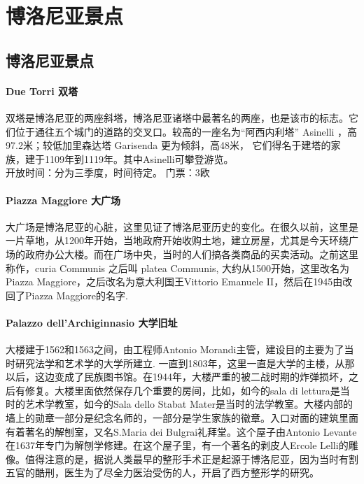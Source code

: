 \chapter{博洛尼亚景点}              


\section{博洛尼亚景点}

\subsubsection{Due Torri 双塔}
双塔是博洛尼亚的两座斜塔，博洛尼亚诸塔中最著名的两座，也是该市的标志。它们位于通往五个城门的道路的交叉口。较高的一座名为“阿西内利塔” Asinelli  ，高97.2米；较低加里森达塔 Garisenda 更为倾斜，高48米， 它们得名于建塔的家族，建于1109年到1119年。其中Asinelli可攀登游览。\\
开放时间：分为三季度，时间待定。 门票：3欧


\subsubsection{Piazza Maggiore 大广场}
大广场是博洛尼亚的心脏，这里见证了博洛尼亚历史的变化。在很久以前，这里是一片草地，从1200年开始，当地政府开始收购土地，建立房屋，尤其是今天环绕广场的政府办公大楼。而在广场中央，当时的人们搞各类商品的买卖活动。之前这里称作，curia Communis 之后叫 platea Communis, 大约从1500开始，这里改名为Piazza Maggiore，之后改名为意大利国王Vittorio Emanuele II，然后在1945由改回了Piazza Maggiore的名字.
 
\subsubsection{Palazzo dell'Archiginnasio 大学旧址}
大楼建于1562和1563之间，由工程师Antonio Morandi主管，建设目的主要为了当时研究法学和艺术学的大学所建立. 一直到1803年，这里一直是大学的主楼，从那以后，这边变成了民族图书馆。在1944年，大楼严重的被二战时期的炸弹损坏，之后有修复。大楼里面依然保存几个重要的房间，比如，如今的sala di lettura是当时的艺术学教室，如今的Sala dello Stabat Mater是当时的法学教室。大楼内部的墙上的勋章一部分是纪念名师的，一部分是学生家族的徽章。入口对面的建筑里面有着著名的解刨室，又名S.Maria dei Bulgrai礼拜堂。这个屋子由Antonio Levante在1637年专门为解刨学修建。在这个屋子里，有一个著名的剥皮人Ercole Lelli的雕像。值得注意的是，据说人类最早的整形手术正是起源于博洛尼亚，因为当时有割五官的酷刑，医生为了尽全力医治受伤的人，开启了西方整形学的研究。


